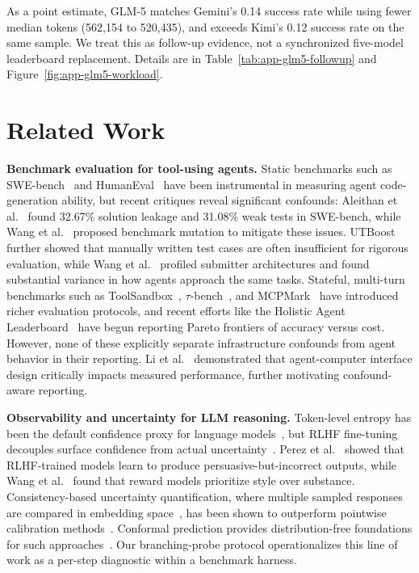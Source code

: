 \documentclass[11pt]{article}
\begin{document}
As a point estimate, GLM-5 matches Gemini's 0.14 success rate while using fewer median tokens (562{,}154 to 520{,}435), and exceeds Kimi's 0.12 success rate on the same sample. We treat this as follow-up evidence, not a synchronized five-model leaderboard replacement. Details are in Table~\ref{tab:app-glm5-followup} and Figure~\ref{fig:app-glm5-workload}.

\section{Related Work}

\textbf{Benchmark evaluation for tool-using agents.}
Static benchmarks such as SWE-bench~\cite{jimenez2024swebench} and HumanEval~\cite{chen2021codex} have been instrumental in measuring agent code-generation ability, but recent critiques reveal significant confounds: Aleithan et al.~\cite{Aleithan2024SWEBenchPlus} found 32.67\% solution leakage and 31.08\% weak tests in SWE-bench, while Wang et al.~\cite{Wang2025SavingSWE} proposed benchmark mutation to mitigate these issues. UTBoost~\cite{wei2024utboost} further showed that manually written test cases are often insufficient for rigorous evaluation, while Wang et al.~\cite{Wang2025DissectingSWE} profiled submitter architectures and found substantial variance in how agents approach the same tasks. Stateful, multi-turn benchmarks such as ToolSandbox~\cite{Zhou2024ToolSandbox}, $\tau$-bench~\cite{Fu2024Tau}, and MCPMark~\cite{Grattafiori2025MCPMark} have introduced richer evaluation protocols, and recent efforts like the Holistic Agent Leaderboard~\cite{Doris2025HAL} have begun reporting Pareto frontiers of accuracy versus cost. However, none of these explicitly separate infrastructure confounds from agent behavior in their reporting. Li et al.~\cite{Li2024SWEAgent} demonstrated that agent-computer interface design critically impacts measured performance, further motivating confound-aware reporting.

\textbf{Observability and uncertainty for LLM reasoning.}
Token-level entropy has been the default confidence proxy for language models~\cite{holtzman2020curious,shannon1948mathematical}, but RLHF fine-tuning decouples surface confidence from actual uncertainty~\cite{Chen2025Overconfidence,Tian2023Calibration,ouyang2022training}. Perez et al.~\cite{Perez2024Mislead} showed that RLHF-trained models learn to produce persuasive-but-incorrect outputs, while Wang et al.~\cite{Wang2024StyleOutweighs} found that reward models prioritize style over substance. Consistency-based uncertainty quantification, where multiple sampled responses are compared in embedding space~\cite{reimers2019sentencebert}, has been shown to outperform pointwise calibration methods~\cite{Zhou2024Consistency}. Conformal prediction provides distribution-free foundations for such approaches~\cite{Barber2022ConformalPrediction,Vovk2025Conformal}. Our branching-probe protocol operationalizes this line of work as a per-step diagnostic within a benchmark harness.
\end{document}
